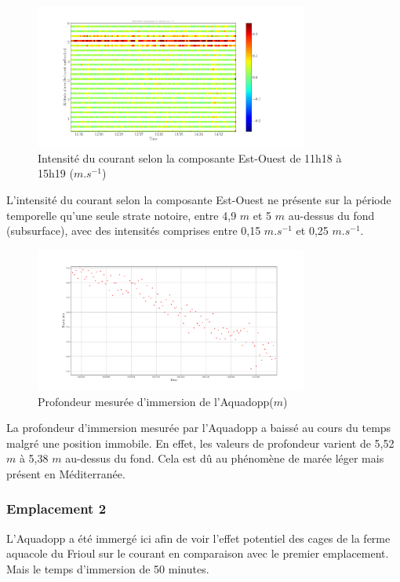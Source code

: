 \documentclass[12pt]{article}
\begin{document}
\begin{figure}[!h]
	\begin{center}
		\includegraphics[width=0.8\textwidth]{180321021scatterv1.png}
		\caption{Intensité du courant selon la composante Est-Ouest de 11h18 à 15h19 ($m.s^{-1}$)}
	\end{center}
\end{figure}
L'intensité du courant selon la composante Est-Ouest ne présente sur la période temporelle qu'une seule strate notoire, entre 4,9 $m$ et 5 $m$ au-dessus du fond (subsurface), avec des intensités comprises entre 0,15 $m.s^{-1}$ et 0,25 $m.s^{-1}$.\\

\begin{figure}[!h]
	\begin{center}
		\includegraphics[width=0.8\textwidth]{Figure_2.png}
		\caption{Profondeur mesurée d'immersion de l'Aquadopp($m$)}
	\end{center}
\end{figure}
La profondeur d'immersion mesurée par l'Aquadopp a baissé au cours du temps malgré une position immobile. En effet, les valeurs de profondeur varient de 5,52 $m$ à 5,38 $m$ au-dessus du fond. Cela est dû au phénomène de marée léger mais présent en Méditerranée.

\subsubsection{Emplacement 2}
L'Aquadopp a été immergé ici afin de voir l'effet potentiel des cages de la ferme aquacole du Frioul sur le courant en comparaison avec le premier emplacement. Mais le temps d'immersion de 50 minutes.\\
\end{document}
